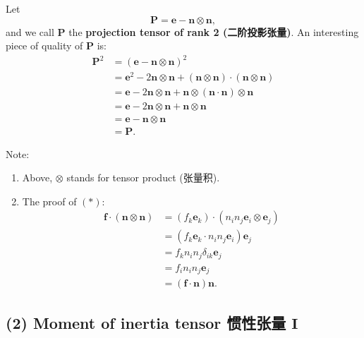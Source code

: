 Let \[\mathbf P = \mathbf e - \boldsymbol n \otimes \boldsymbol n,\] and
we call \(\mathbf P\) the \textbf{projection tensor of rank 2
(二阶投影张量)}. An interesting piece of quality of \(\mathbf P\) is:
\begin{align*}
    \mathbf P^2 & = (\mathbf e - \boldsymbol n \otimes \boldsymbol n)^2 \\
    & = \mathbf e^2 - 2 \boldsymbol n \otimes \boldsymbol n + (\boldsymbol n \otimes \boldsymbol n) \cdot (\boldsymbol n \otimes \boldsymbol n) \\
    & = \mathbf e - 2 \boldsymbol n \otimes \boldsymbol n + \boldsymbol n \otimes (\boldsymbol n \cdot \boldsymbol n) \otimes \boldsymbol n \\
    & = \mathbf e - 2 \boldsymbol n \otimes \boldsymbol n + \boldsymbol n \otimes \boldsymbol n\\
    & = \mathbf e - \boldsymbol n \otimes \boldsymbol n \\
    & = \mathbf P.
\end{align*}

Note:

\begin{enumerate}
\def\labelenumi{\arabic{enumi}.}
\tightlist{}
\item Above, \(\otimes\) stands for tensor product (张量积).
\item 
  The proof of \((*)\): \begin{align*}
   \boldsymbol f \cdot (\boldsymbol n \otimes \boldsymbol n) & = (f_k \boldsymbol e_k) \cdot (n_i n_j \boldsymbol e_i \otimes \boldsymbol e_j) \\
   & = (f_k \boldsymbol e_k \cdot n_i n_j \boldsymbol e_i) \boldsymbol e_j \\
   & = f_k n_i n_j \delta_{ik} \boldsymbol e_j \\
   & = f_i n_i n_j \boldsymbol e_j \\
   & = (\boldsymbol f \cdot \boldsymbol n) \boldsymbol n.
  \end{align*}
\end{enumerate}

\subsection*{(2) Moment of inertia tensor 惯性张量
\(\boldsymbol I\)}\label{moment-of-inertia-tensor-ux60efux6027ux5f20ux91cf-boldsymbol-i}

